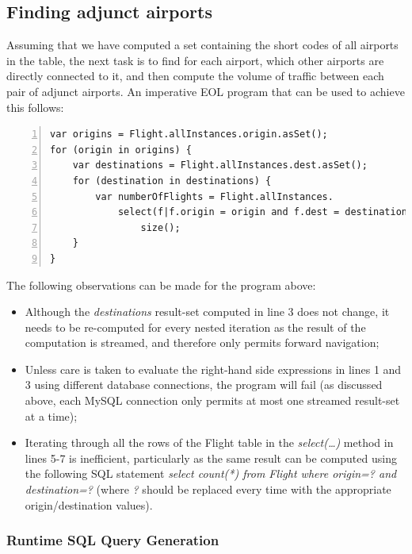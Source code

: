 \subsection{Finding adjunct airports}

Assuming that we have computed a set containing the short codes of all airports in the table, the next task is to find for each airport, which other airports are directly connected to it, and then compute the volume of traffic between each pair of adjunct airports. An imperative EOL program that can be used to achieve this follows:

\begin{lstlisting}[language=EOL, numbers=left]
var origins = Flight.allInstances.origin.asSet();
for (origin in origins) {
	var destinations = Flight.allInstances.dest.asSet();
	for (destination in destinations) {
		var numberOfFlights = Flight.allInstances.
			select(f|f.origin = origin and f.dest = destination).
				size();
	}
}
\end{lstlisting}

The following observations can be made for the program above:

\begin{itemize}
  \item Although the \emph{destinations} result-set computed in line 3 does not change, it needs to be re-computed for every nested iteration as the result of the computation is streamed, and therefore only permits forward navigation;
  \item Unless care is taken to evaluate the right-hand side expressions in lines 1 and 3 using different database connections, the program will fail (as discussed above, each MySQL connection only permits at most one streamed result-set at a time);
  \item Iterating through all the rows of the Flight table in the \emph{select(\ldots)} method in lines 5-7 is inefficient, particularly as the same result can be computed using the following SQL statement \emph{select count(*) from Flight where origin=? and destination=?} (where \emph{?} should be replaced every time with the appropriate origin/destination values).
\end{itemize}

\subsubsection{Runtime SQL Query Generation}



